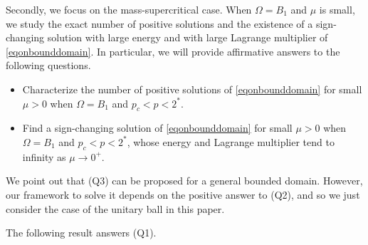 \documentclass[10pt,a4paper]{article}
\theoremstyle{definition} \theoremstyle{remark}
\numberwithin{equation}{section}
\begin{document}
Secondly, we focus on the mass-supercritical case. When $\Omega = B_1$ and $\mu$ is small, we study the exact number of positive solutions and the existence of a sign-changing solution with large energy and with large Lagrange multiplier of \eqref{eqonbounddomain}. In particular, we will provide affirmative answers to the following questions.
\begin{itemize}
	\item[{\bf(Q2)}:] Characterize the number of positive solutions of \eqref{eqonbounddomain} for small $\mu > 0$ when $\Omega = B_1$ and $p_c < p < 2^*$.
	\item[{\bf(Q3)}:] Find a sign-changing solution of \eqref{eqonbounddomain} for small $\mu > 0$ when $\Omega = B_1$ and $p_c < p < 2^*$, whose energy and Lagrange multiplier tend to infinity as $\mu \to 0^+$.
\end{itemize}
We point out that (Q3) can be proposed for a general bounded domain. However, our framework to solve it depends on the positive answer to (Q2), and so we just consider the case of the unitary ball in this paper.

\vskip0.1in
The following result answers (Q1). 

\end{document}
